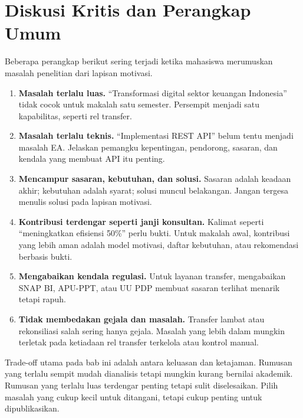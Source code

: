\section{Diskusi Kritis dan Perangkap Umum}

Beberapa perangkap berikut sering terjadi ketika mahasiswa merumuskan masalah
penelitian dari lapisan motivasi.

\begin{enumerate}
  \item \textbf{Masalah terlalu luas.} ``Transformasi digital sektor keuangan
        Indonesia'' tidak cocok untuk makalah satu semester. Persempit menjadi
        satu kapabilitas, seperti rel transfer.
  \item \textbf{Masalah terlalu teknis.} ``Implementasi REST API'' belum tentu
        menjadi masalah EA. Jelaskan pemangku kepentingan, pendorong, sasaran,
        dan kendala yang membuat API itu penting.
  \item \textbf{Mencampur sasaran, kebutuhan, dan solusi.} Sasaran adalah keadaan
        akhir; kebutuhan adalah syarat; solusi muncul belakangan. Jangan tergesa
        menulis solusi pada lapisan motivasi.
  \item \textbf{Kontribusi terdengar seperti janji konsultan.} Kalimat seperti
        ``meningkatkan efisiensi 50\%'' perlu bukti. Untuk makalah awal,
        kontribusi yang lebih aman adalah model motivasi, daftar kebutuhan, atau
        rekomendasi berbasis bukti.
  \item \textbf{Mengabaikan kendala regulasi.} Untuk layanan transfer, mengabaikan
        SNAP BI, APU-PPT, atau UU PDP membuat sasaran terlihat menarik tetapi
        rapuh.
  \item \textbf{Tidak membedakan gejala dan masalah.} Transfer lambat atau
        rekonsiliasi salah sering hanya gejala. Masalah yang lebih dalam mungkin
        terletak pada ketiadaan rel transfer terkelola atau kontrol manual.
\end{enumerate}

Trade-off utama pada bab ini adalah antara keluasan dan ketajaman. Rumusan yang
terlalu sempit mudah dianalisis tetapi mungkin kurang bernilai akademik. Rumusan
yang terlalu luas terdengar penting tetapi sulit diselesaikan. Pilih masalah
yang cukup kecil untuk ditangani, tetapi cukup penting untuk dipublikasikan.

